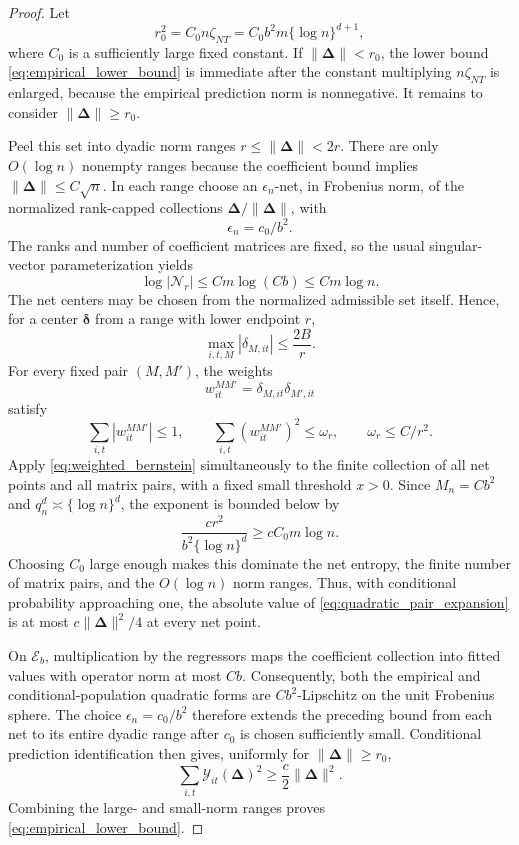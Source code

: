 \documentclass[11pt]{article}
\numberwithin{equation}{section}
\theoremstyle{remark}
\newcommand{\bDelta}{\bm\Delta}
\begin{document}
\begin{proof}
Let
\[
r_0^2=C_0n\zeta_{NT}
=C_0b^2m\{\log n\}^{d+1},
\]
where $C_0$ is a sufficiently large fixed constant. If $\|\bDelta\|<r_0$, the lower bound \eqref{eq:empirical_lower_bound} is immediate after the constant multiplying $n\zeta_{NT}$ is enlarged, because the empirical prediction norm is nonnegative. It remains to consider $\|\bDelta\|\ge r_0$.

Peel this set into dyadic norm ranges $r\le\|\bDelta\|<2r$. There are only $O(\log n)$ nonempty ranges because the coefficient bound implies $\|\bDelta\|\le C\sqrt n$. In each range choose an $\epsilon_n$-net, in Frobenius norm, of the normalized rank-capped collections $\bDelta/\|\bDelta\|$, with
\[
\epsilon_n=c_0/b^2.
\]
The ranks and number of coefficient matrices are fixed, so the usual singular-vector parameterization yields
\[
\log|\mathcal N_r|
\le
Cm\log(Cb)
\le Cm\log n.
\]
The net centers may be chosen from the normalized admissible set itself. Hence, for a center $\bm\delta$ from a range with lower endpoint $r$,
\[
\max_{i,t,M}|\delta_{M,it}|
\le\frac{2B}{r}.
\]
For every fixed pair $(M,M')$, the weights
\[
w_{it}^{MM'}=\delta_{M,it}\delta_{M',it}
\]
satisfy
\[
\sum_{i,t}|w_{it}^{MM'}|\le1,
\qquad
\sum_{i,t}(w_{it}^{MM'})^2
\le\omega_r,
\qquad
\omega_r\le C/r^2.
\]
Apply \eqref{eq:weighted_bernstein} simultaneously to the finite collection of all net points and all matrix pairs, with a fixed small threshold $x>0$. Since $M_n=Cb^2$ and $q_n^d\asymp\{\log n\}^d$, the exponent is bounded below by
\[
\frac{cr^2}{b^2\{\log n\}^{d}}
\ge
cC_0m\log n.
\]
Choosing $C_0$ large enough makes this dominate the net entropy, the finite number of matrix pairs, and the $O(\log n)$ norm ranges. Thus, with conditional probability approaching one, the absolute value of \eqref{eq:quadratic_pair_expansion} is at most $c\|\bDelta\|^2/4$ at every net point.

On $\mathcal E_b$, multiplication by the regressors maps the coefficient collection into fitted values with operator norm at most $Cb$. Consequently, both the empirical and conditional-population quadratic forms are $Cb^2$-Lipschitz on the unit Frobenius sphere. The choice $\epsilon_n=c_0/b^2$ therefore extends the preceding bound from each net to its entire dyadic range after $c_0$ is chosen sufficiently small. Conditional prediction identification then gives, uniformly for $\|\bDelta\|\ge r_0$,
\[
\sum_{i,t}\mathcal Y_{it}(\bDelta)^2
\ge
\frac c2\|\bDelta\|^2.
\]
Combining the large- and small-norm ranges proves \eqref{eq:empirical_lower_bound}.


\end{proof}
\end{document}
